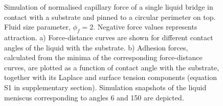\documentclass[vruler,JEB]{COB}%
\begin{document}
\begin{figure}[!t]
\centering
{}%
\hskip3pc
%
\caption[]{Simulation of normalised capillary force of a single liquid
bridge in contact with a substrate and pinned to a circular perimeter
on top. Fluid size parameter, $\phi_{f}=2$. Negative force values
represents attraction. a) Force-distance curves are shown for different
contact angles of the liquid with the substrate. b) Adhesion forces,
calculated from the minima of the corresponding force-distance curves,
are plotted as a function of contact angle with the substrate, together
with its Laplace and surface tension components (equation S1 in supplementary section).
Simulation snapshots of the liquid meniscus corresponding to angles
6\textdegree{} and 150\textdegree{} are depicted.}
\label{fig:Single-bridge}
\end{figure}
\end{document}
